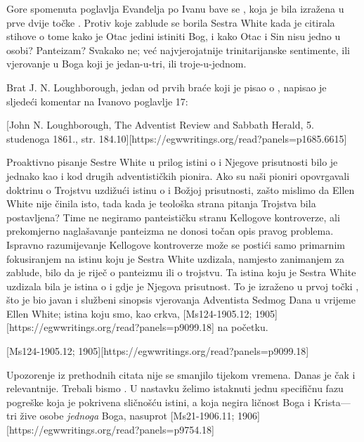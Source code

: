 Gore spomenuta poglavlja Evanđelja po Ivanu bave se , koja je bila izražena u prve dvije točke . Protiv koje zablude se borila Sestra White kada je citirala stihove o tome kako je Otac jedini istiniti Bog, i kako Otac i Sin nisu jedno u osobi? Panteizam? Svakako ne; već najvjerojatnije trinitarijanske sentimente, ili vjerovanje u Boga koji je jedan-u-tri, ili troje-u-jednom.

Brat J. N. Loughborough, jedan od prvih braće koji je pisao o , napisao je sljedeći komentar na Ivanovo poglavlje 17:

[John N. Loughborough, The Adventist Review and Sabbath Herald, 5. studenoga 1861., str. 184.10][https://egwwritings.org/read?panels=p1685.6615]

Proaktivno pisanje Sestre White u prilog istini o  i Njegove prisutnosti bilo je jednako kao i kod drugih adventističkih pionira. Ako su naši pioniri opovrgavali doktrinu o Trojstvu uzdižući istinu o  i Božjoj prisutnosti, zašto mislimo da Ellen White nije činila isto, tada kada je teološka strana pitanja Trojstva bila postavljena? Time ne negiramo panteističku stranu Kellogove kontroverze, ali prekomjerno naglašavanje panteizma ne donosi točan opis pravog problema. Ispravno razumijevanje Kellogove kontroverze može se postići samo primarnim fokusiranjem na istinu koju je Sestra White uzdizala, namjesto zanimanjem za zablude, bilo da je riječ o panteizmu ili o trojstvu. Ta istina koju je Sestra White uzdizala bila je istina o  i gdje je Njegova prisutnost. To je izraženo u prvoj točki , što je bio javan i službeni sinopsis vjerovanja Adventista Sedmog Dana u vrijeme Ellen White; istina koju smo, kao crkva, [Ms124-1905.12; 1905][https://egwwritings.org/read?panels=p9099.18] na početku.

[Ms124-1905.12; 1905][https://egwwritings.org/read?panels=p9099.18]

Upozorenje iz prethodnih citata nije se smanjilo tijekom vremena. Danas je čak i relevantnije. Trebali bismo . U nastavku želimo istaknuti jednu specifičnu fazu pogreške koja je pokrivena sličnošću istini, a koja negira ličnost Boga i Krista—tri žive osobe \textit{jednoga} Boga, nasuprot [Ms21-1906.11; 1906][https://egwwritings.org/read?panels=p9754.18]

